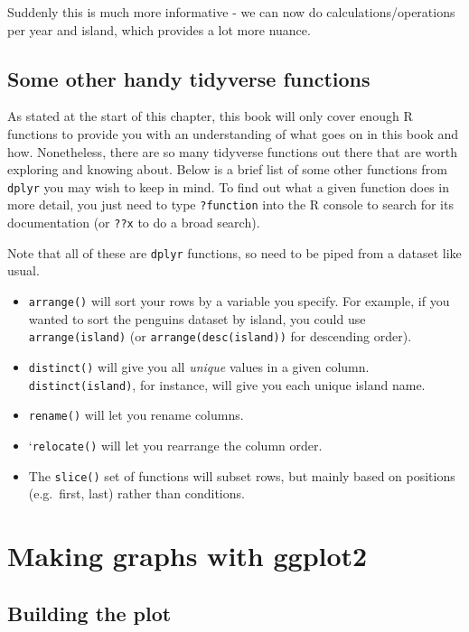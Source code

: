 \documentclass[
]{book}
\providecommand{\tightlist}{%
  \setlength{\itemsep}{0pt}\setlength{\parskip}{0pt}}
\begin{document}
Suddenly this is much more informative - we can now do calculations/operations per year and island, which provides a lot more nuance.

\subsection{Some other handy tidyverse functions}\label{some-other-handy-tidyverse-functions}

As stated at the start of this chapter, this book will only cover enough R functions to provide you with an understanding of what goes on in this book and how. Nonetheless, there are so many tidyverse functions out there that are worth exploring and knowing about. Below is a brief list of some other functions from \texttt{dplyr} you may wish to keep in mind. To find out what a given function does in more detail, you just need to type \texttt{?function} into the R console to search for its documentation (or \texttt{??x} to do a broad search).

Note that all of these are \texttt{dplyr} functions, so need to be piped from a dataset like usual.

\begin{itemize}
\tightlist
\item
  \texttt{arrange()} will sort your rows by a variable you specify. For example, if you wanted to sort the penguins dataset by island, you could use \texttt{arrange(island)} (or \texttt{arrange(desc(island))} for descending order).
\item
  \texttt{distinct()} will give you all \emph{unique} values in a given column. \texttt{distinct(island)}, for instance, will give you each unique island name.
\item
  \texttt{rename()} will let you rename columns.
\item
  `\texttt{relocate()} will let you rearrange the column order.
\item
  The \texttt{slice()} set of functions will subset rows, but mainly based on positions (e.g.~first, last) rather than conditions.
\end{itemize}

\section{Making graphs with ggplot2}\label{ggplot}

\subsection{Building the plot}\label{building-the-plot}
\end{document}
